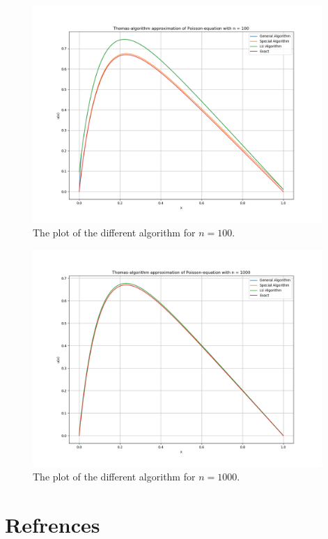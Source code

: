 \documentclass{article}
\begin{document}
\begin{figure}[ht]
	\centering
	\includegraphics[width = 11cm]{program/data100.png}
	\caption{The plot of the different algorithm for $n = 100$. }
	\label{fig:data100png}
\end{figure}

\begin{figure}[ht]
	\centering
	\includegraphics[width = 11cm]{program/data1000.png}
	\caption{The plot of the different algorithm for $n = 1000$. }
	\label{fig:data1000png}
\end{figure}



\clearpage

\vspace{1cm}

\section{Refrences}
\end{document}
